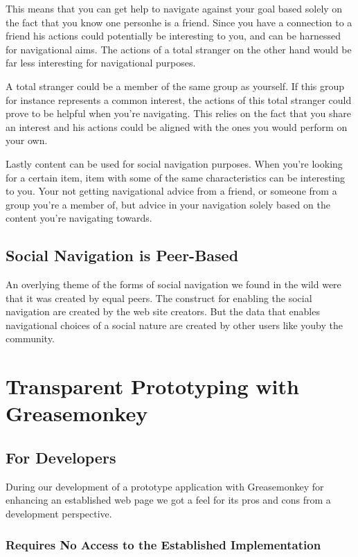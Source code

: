 This means that you can get help to navigate against your goal based solely
on the fact that you know one person\dash{}he is a friend. Since you have a
connection to a friend his actions could potentially be interesting to you,
and can be harnessed for navigational aims. The actions of a total stranger
on the other hand would be far less interesting for navigational purposes.

A total stranger could be a member of the same group as yourself. If this
group for instance represents a common interest, the actions of this total
stranger could prove to be helpful when you're navigating. This relies on the
fact that you share an interest and his actions could be aligned with
the ones you would perform on your own.

Lastly content can be used for social navigation purposes. When you're looking
for a certain item, item with some of the same characteristics can be
interesting to you. Your not getting navigational advice from a friend, or
someone from a group you're a member of, but advice in your navigation solely
based on the content you're navigating towards.

\subsection{Social Navigation is Peer-Based}

An overlying theme of the forms of social navigation we found in the wild were
that it was created by equal peers. The construct for enabling the social
navigation are created by the web site creators. But the data that
enables navigational choices of a social nature are created by other users
like you\dash{}by the community.

\section{Transparent Prototyping with Greasemonkey}

\subsection{For Developers}

During our development of a prototype application with Greasemonkey for
enhancing an established web page we got a feel for its pros and cons from a
development perspective.

\subsubsection{Requires No Access to the Established Implementation}

